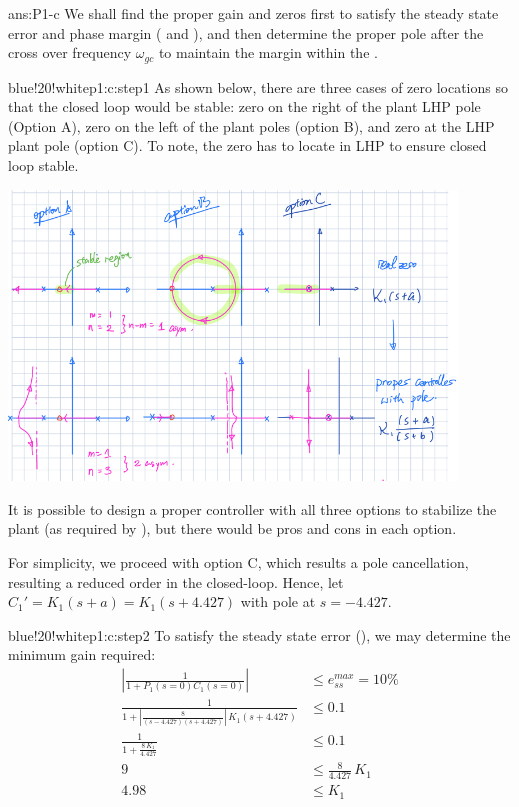 \documentclass{tron}
\begin{document}
\begin{answer}{ans:P1-c}
	We shall find the proper gain and zeros first to satisfy the steady state error and phase margin ( and ), and then determine the proper pole after the cross over frequency $\omega_{gc}$ to maintain the margin within the . 
		
	\begin{note}{blue!20!white}{p1:c:step1}
		As  shown below, there are three cases of zero locations so that the closed loop would be stable: zero on the right of the plant \Gls{LHP} pole (Option A), zero on the left of the plant poles (option B), and zero at the \Gls{LHP} plant pole (option C). To note, the zero has to locate in LHP to ensure closed loop stable.
	
		{	
			\centering
	      	\includegraphics[width=450px]{Fig/root-locus}
	      	\par
	    }
	    
	    It is possible to design a proper controller with all three options to stabilize the plant (as required by ), but there would be pros and cons in each option.
	    
	    For simplicity, we proceed with option C, which results a pole cancellation, resulting a reduced order in the closed-loop. Hence, let $C_1' = K_1 (s+a) = K_1 (s + 4.427)$ with pole at $s = -4.427$.	
	\end{note}
	
	\begin{note}{blue!20!white}{p1:c:step2}
		To satisfy the steady state error (), we may determine the minimum gain required:
		\begin{align}
			\left| \frac1{1+P_1(s=0)C_1(s=0)} \right| & \leq e_{ss}^{max} = 10\% \\
			\frac1{1 + \left|\frac{8}{(s-4.427)(s+4.427)}\right| \, K_1 (s + 4.427)}  & \leq 0.1\\
			\frac1{1 + \frac{8 \,  K_1}{4.427}} & \leq 0.1 \\
			9 & \leq \frac{8}{4.427} \, K_1 \\
			4.98 & \leq K_1 
		\end{align}
		

\end{note}
\end{answer}
\end{document}
